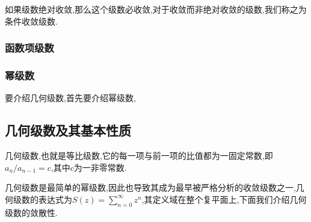 \documentclass[zihao=-4,a4paper]{ctexart}
\begin{document}
如果级数绝对收敛,那么这个级数必收敛,对于收敛而非绝对收敛的级数,我们称之为条件收敛级数.

\subsubsection{函数项级数}


\subsubsection{幂级数}
要介绍几何级数,首先要介绍幂级数,

\subsection{几何级数及其基本性质}

几何级数,也就是等比级数,它的每一项与前一项的比值都为一固定常数,即${a}_{n}/{a}_{n-1}=c$,其中$c$为一非零常数.

几何级数是最简单的幂级数,因此也导致其成为最早被严格分析的收敛级数之一,几何级数的表达式为$S\left(z\right)=\sum^{\infty}_{n=0}{z}^{n}$,其定义域在整个复平面上,下面我们介绍几何级数的敛散性.








\end{document}

